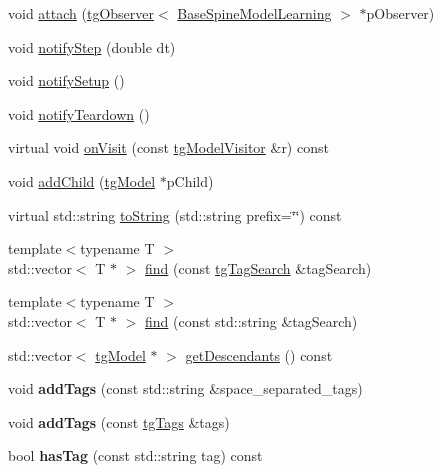 \begin{DoxyCompactItemize}
\item 
void \hyperlink{classtg_subject_a56ecfd33a048c3a7f1a884318d9af548}{attach} (\hyperlink{classtg_observer}{tg\-Observer}$<$ \hyperlink{class_base_spine_model_learning}{Base\-Spine\-Model\-Learning} $>$ $\ast$p\-Observer)
\item 
void \hyperlink{classtg_subject_ad9640aa7fcc1e0b4ce8a913a4ce1ea42}{notify\-Step} (double dt)
\item 
void \hyperlink{classtg_subject_a80799e5d0c8512d3d05a55764790392b}{notify\-Setup} ()
\item 
void \hyperlink{classtg_subject_adf7a60dbb0faf0de5528f862e7953e63}{notify\-Teardown} ()
\item 
virtual void \hyperlink{classtg_model_aee6457e0fc54d5570b87bfc779f9b1c0}{on\-Visit} (const \hyperlink{classtg_model_visitor}{tg\-Model\-Visitor} \&r) const 
\item 
void \hyperlink{classtg_model_a292c17848b96caee32b2286e44c13f2f}{add\-Child} (\hyperlink{classtg_model}{tg\-Model} $\ast$p\-Child)
\item 
virtual std\-::string \hyperlink{classtg_model_af37b0c1a6d4060bfe0bb9b5038a17725}{to\-String} (std\-::string prefix=\char`\"{}\char`\"{}) const 
\item 
{\footnotesize template$<$typename T $>$ }\\std\-::vector$<$ T $\ast$ $>$ \hyperlink{classtg_model_ab75836fdfbd9200f165c3b28a19630c0}{find} (const \hyperlink{classtg_tag_search}{tg\-Tag\-Search} \&tag\-Search)
\item 
{\footnotesize template$<$typename T $>$ }\\std\-::vector$<$ T $\ast$ $>$ \hyperlink{classtg_model_aa40b5fb32f8941e04d537f4e6c6db35c}{find} (const std\-::string \&tag\-Search)
\item 
std\-::vector$<$ \hyperlink{classtg_model}{tg\-Model} $\ast$ $>$ \hyperlink{classtg_model_a2efa4321fa5c77b4ce23b01f6fd3a1c4}{get\-Descendants} () const 
\item 
\hypertarget{classtg_taggable_af0b8f1729653b0b90d2fecbd51163612}{void {\bfseries add\-Tags} (const std\-::string \&space\-\_\-separated\-\_\-tags)}\label{classtg_taggable_af0b8f1729653b0b90d2fecbd51163612}

\item 
\hypertarget{classtg_taggable_af28e3fe1a7e4eb28772dc006d575dd1f}{void {\bfseries add\-Tags} (const \hyperlink{classtg_tags}{tg\-Tags} \&tags)}\label{classtg_taggable_af28e3fe1a7e4eb28772dc006d575dd1f}

\item 
\hypertarget{classtg_taggable_ae31f65869c8887bfeb34a344902c4d5b}{bool {\bfseries has\-Tag} (const std\-::string tag) const }\label{classtg_taggable_ae31f65869c8887bfeb34a344902c4d5b}


\end{DoxyCompactItemize}
